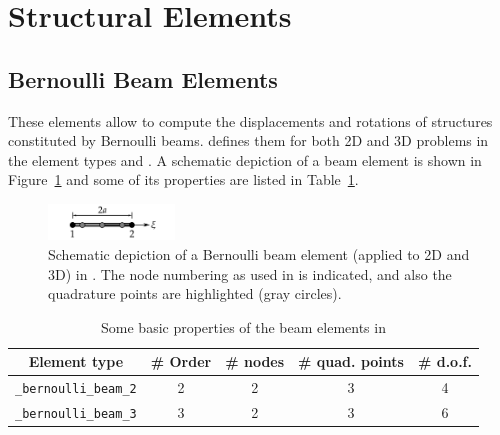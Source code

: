 \section{Structural Elements}

\subsection*{Bernoulli Beam Elements}
These elements allow to compute the displacements and rotations of structures constituted by Bernoulli beams. \akantu defines them for both 2D and 3D problems in the element types  and . A schematic depiction of a beam element is shown in Figure~\ref{fig:elements:bernoulli} and some of its properties are listed in Table~\ref{tab:elements:bernoulli}.


\begin{figure}[htb]
  \centering
  \includegraphics[width=0.3\textwidth]{figures/elements/bernoulli_2}
  \caption{Schematic depiction of a Bernoulli beam element (applied to 2D and 3D) in \akantu. The node numbering as used in \akantu is indicated, and also the quadrature points are highlighted (gray circles).}
  \label{fig:elements:bernoulli}
\end{figure}
\begin{table}[htb]
  \centering
  \begin{tabular}{c|cccc}
    \toprule
    Element type                  & \# Order & \# nodes &\# quad. points & \# d.o.f.\\
    \midrule
    \texttt{\_bernoulli\_beam\_2} &         2&         2&              3&  4\\
    \texttt{\_bernoulli\_beam\_3} &         3&         2&              3&  6\\
    \bottomrule
  \end{tabular}
  \caption{Some basic properties of the beam elements in \akantu}
  \label{tab:elements:bernoulli}
\end{table}

